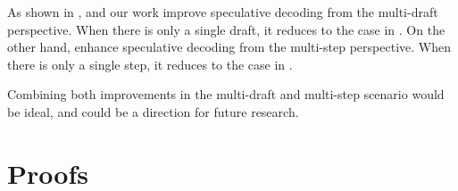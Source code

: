 \documentclass{article}
\begin{document}
As shown in , \citet{sun2024spectr,khisti2024importanceweighted} and our work improve speculative decoding from the multi-draft perspective. When there is only a single draft, it reduces to the case in \citet{leviathan2023fast,chen2023accelerating}. On the other hand, \citet{sun2024optimal,huaccelerated,sunblock} enhance speculative decoding from the multi-step perspective. When there is only a single step, it reduces to the case in \citet{leviathan2023fast,chen2023accelerating}.

Combining both improvements in the multi-draft and multi-step scenario would be ideal, and could be a direction for future research. \section{Proofs}\label{se:proofs}
\end{document}

